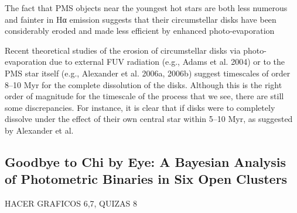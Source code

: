 \documentclass[../Main.tex]{subfiles}
\begin{document}
{The fact that PMS objects near the youngest hot stars are both
less numerous and fainter in Hα emission suggests that their
circumstellar disks have been considerably eroded and made
less efficient by enhanced photo-evaporation

Recent theoretical studies of the erosion of circumstellar
disks via photo-evaporation due to external FUV radiation (e.g.,
Adams et al. 2004) or to the PMS star itself (e.g., Alexander
et al. 2006a, 2006b) suggest timescales of order 8–10 Myr for
the complete dissolution of the disks. Although this is the right
order of magnitude for the timescale of the process that we see,
there are still some discrepancies. For instance, it is clear that if
disks were to completely dissolve under the effect of their own
central star within 5–10 Myr, as suggested by Alexander et al.


\subsection{Goodbye to Chi by Eye: A Bayesian Analysis of Photometric Binaries in Six Open Clusters}


HACER GRAFICOS 6,7, QUIZAS 8

}
\end{document}

